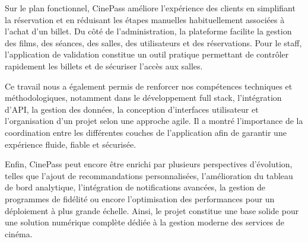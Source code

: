 \documentclass[12pt]{report}
\begin{document}
Sur le plan fonctionnel, CinePass améliore l'expérience des clients en simplifiant la réservation et en réduisant les étapes manuelles habituellement associées à l'achat d'un billet. Du côté de l'administration, la plateforme facilite la gestion des films, des séances, des salles, des utilisateurs et des réservations. Pour le staff, l'application de validation constitue un outil pratique permettant de contrôler rapidement les billets et de sécuriser l'accès aux salles.

Ce travail nous a également permis de renforcer nos compétences techniques et méthodologiques, notamment dans le développement full stack, l'intégration d'API, la gestion des données, la conception d'interfaces utilisateur et l'organisation d'un projet selon une approche agile. Il a montré l'importance de la coordination entre les différentes couches de l'application afin de garantir une expérience fluide, fiable et sécurisée.

Enfin, CinePass peut encore être enrichi par plusieurs perspectives d'évolution, telles que l'ajout de recommandations personnalisées, l'amélioration du tableau de bord analytique, l'intégration de notifications avancées, la gestion de programmes de fidélité ou encore l'optimisation des performances pour un déploiement à plus grande échelle. Ainsi, le projet constitue une base solide pour une solution numérique complète dédiée à la gestion moderne des services de cinéma.
\end{document}
